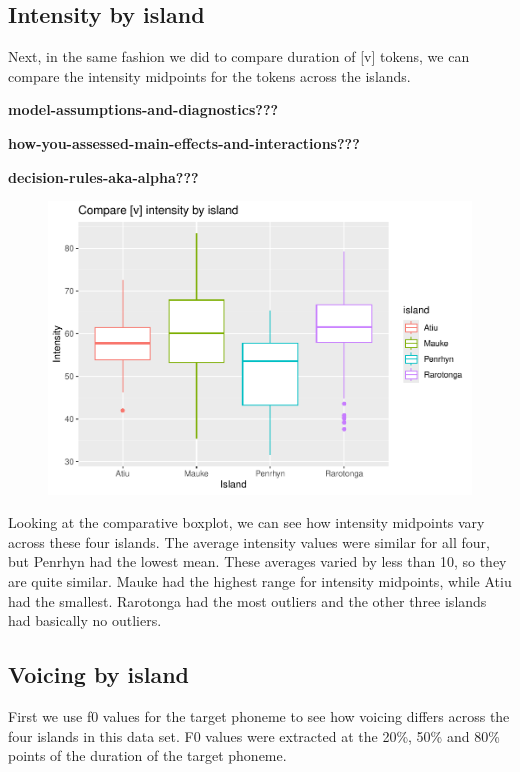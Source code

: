 \documentclass[
  ,man]{apa6}
\begin{document}
\subsection{Intensity by island}\label{intensity-by-island}

Next, in the same fashion we did to compare duration of {[}v{]} tokens, we can compare the intensity midpoints for the tokens across the islands.

\textbf{model-assumptions-and-diagnostics???}

\textbf{how-you-assessed-main-effects-and-interactions???}

\textbf{decision-rules-aka-alpha???}

\begin{figure}
\includegraphics[width=1\linewidth]{cim_w_v_manuscript_files/figure-latex/intensity-by-island-1} \caption{ }\label{fig:intensity-by-island}
\end{figure}

Looking at the comparative boxplot, we can see how intensity midpoints vary across these four islands. The average intensity values were similar for all four, but Penrhyn had the lowest mean. These averages varied by less than 10, so they are quite similar. Mauke had the highest range for intensity midpoints, while Atiu had the smallest. Rarotonga had the most outliers and the other three islands had basically no outliers.

\subsection{Voicing by island}\label{voicing-by-island}

First we use f0 values for the target phoneme to see how voicing differs across the four islands in this data set. F0 values were extracted at the 20\%, 50\% and 80\% points of the duration of the target phoneme.
\end{document}
